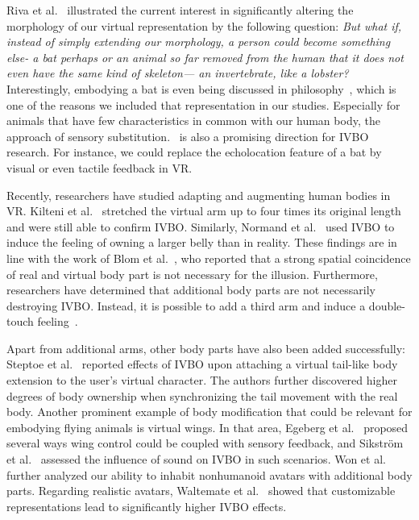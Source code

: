 Riva et al.~ illustrated the current interest in significantly altering the morphology of our virtual representation by the following question: \textit{But what if, instead of simply extending our morphology, a person could become something else- a bat perhaps or an animal so far removed from the human that it does not even have the same kind of skeleton— an invertebrate, like a lobster?} Interestingly, embodying a bat is even being discussed in philosophy~\cite{nagel1974like}, which is one of the reasons we included that representation in our studies. Especially for animals that have few characteristics in common with our human body, the approach of sensory substitution.~\cite{bach2003sensory} is also a promising direction for IVBO research. For instance, we could replace the echolocation feature of a bat by visual or even tactile feedback in VR.

Recently, researchers have studied adapting and augmenting human bodies in VR. Kilteni et al.~ stretched the virtual arm up to four times its original length and were still able to confirm IVBO. Similarly, Normand et al.~ used IVBO to induce the feeling of owning a larger belly than in reality. These findings are in line with the work of Blom et al.~, who reported that a strong spatial coincidence of real and virtual body part is not necessary for the illusion. Furthermore, researchers have determined that additional body parts are not necessarily destroying IVBO. Instead, it is possible to add a third arm and induce a double-touch feeling~\cite{ehrsson2009many,guterstam2011illusion}. 


Apart from additional arms, other body parts have also been added successfully: Steptoe et al.~ reported effects of IVBO upon attaching a virtual tail-like body extension to the user’s virtual character. The authors further discovered higher degrees of body ownership when synchronizing the tail movement with the real body. Another prominent example of body modification that could be relevant for embodying flying animals is virtual wings. In that area, Egeberg et al.~ proposed several ways wing control could be coupled with sensory feedback, and Sikstr\"om et al.~ assessed the influence of sound on IVBO in such scenarios. Won et al.~ further analyzed our ability to inhabit nonhumanoid avatars with additional body parts. Regarding realistic avatars, Waltemate et al.~ showed that customizable representations lead to significantly higher IVBO effects.


